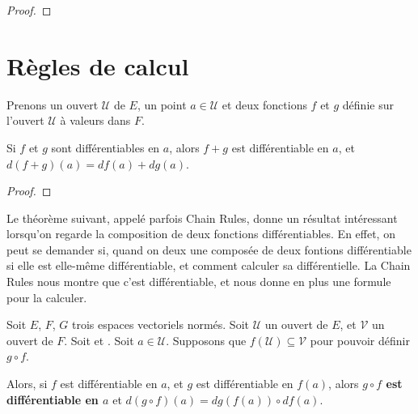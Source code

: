 \begin{proof}
	
\end{proof}

\section{Règles de calcul}


%

Prenons un ouvert $\mathcal{U}$ de $E$, un point $a \in \mathcal{U}$ et deux
fonctions $f$ et $g$ définie sur l'ouvert $\mathcal{U}$ à valeurs dans $F$.

\begin{proposition}
	Si $f$ et $g$ sont différentiables en $a$, alors $f + g$ est différentiable
	en $a$, et $d(f + g)(a) = df(a) + dg(a)$.
\end{proposition}

\begin{proof}
	
\end{proof}

Le théorème suivant, appelé parfois Chain Rules, donne un résultat intéressant
lorsqu'on regarde la composition de deux fonctions différentiables. En effet, on
peut se demander si, quand on deux une composée de deux fontions différentiable
si elle est elle-même différentiable, et comment calculer sa différentielle. La
Chain Rules nous montre que c'est différentiable, et nous donne en plus une
formule pour la calculer.

\begin{theorem}
\label{composition_differential}
	Soit $E$, $F$, $G$ trois espaces vectoriels normés.
	Soit $\mathcal{U}$ un ouvert de $E$, et $\mathcal{V}$ un ouvert de $F$.
	Soit  et
	.
	Soit $a \in \mathcal{U}$.
	Supposons que $f(\mathcal{U}) \subseteq \mathcal{V}$ pour pouvoir définir $g
	\circ f$.

	Alors, si $f$ est différentiable en $a$, et $g$ est différentiable en
	$f(a)$, alors \textbf{$g \circ f$ est différentiable en $a$} et
	$d(g \circ f)(a) = dg(f(a)) \circ df(a)$.
\end{theorem}

